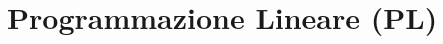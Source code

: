\setcounter{part}{0}
\setcounter{chapter}{0}

\part{Programmazione Lineare (PL)}\label{part:pl}





